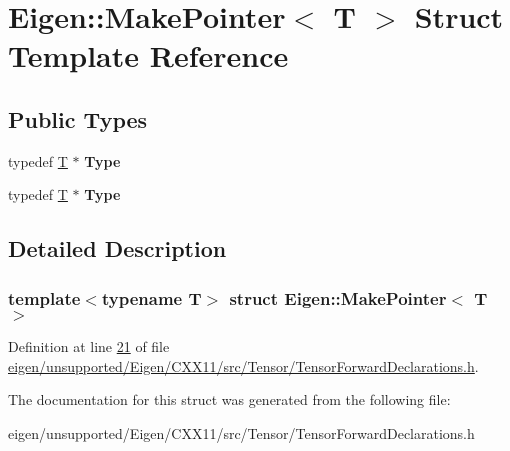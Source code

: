 \hypertarget{struct_eigen_1_1_make_pointer}{}\section{Eigen\+:\+:Make\+Pointer$<$ T $>$ Struct Template Reference}
\label{struct_eigen_1_1_make_pointer}
\subsection*{Public Types}
\begin{DoxyCompactItemize}
\item 
\mbox{\label{struct_eigen_1_1_make_pointer_ae59b162324409aa2a4cc150486b8bf4b}} 
typedef \hyperlink{group___sparse_core___module}{T} $\ast$ {\bfseries Type}
\item 
\mbox{\label{struct_eigen_1_1_make_pointer_ae59b162324409aa2a4cc150486b8bf4b}} 
typedef \hyperlink{group___sparse_core___module}{T} $\ast$ {\bfseries Type}
\end{DoxyCompactItemize}


\subsection{Detailed Description}
\subsubsection*{template$<$typename T$>$\newline
struct Eigen\+::\+Make\+Pointer$<$ T $>$}



Definition at line \hyperlink{eigen_2unsupported_2_eigen_2_c_x_x11_2src_2_tensor_2_tensor_forward_declarations_8h_source_l00021}{21} of file \hyperlink{eigen_2unsupported_2_eigen_2_c_x_x11_2src_2_tensor_2_tensor_forward_declarations_8h_source}{eigen/unsupported/\+Eigen/\+C\+X\+X11/src/\+Tensor/\+Tensor\+Forward\+Declarations.\+h}.



The documentation for this struct was generated from the following file\+:\begin{DoxyCompactItemize}
\item 
eigen/unsupported/\+Eigen/\+C\+X\+X11/src/\+Tensor/\+Tensor\+Forward\+Declarations.\+h\end{DoxyCompactItemize}
